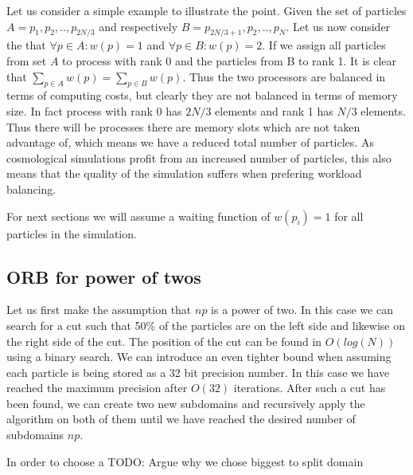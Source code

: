 \documentclass[]{article}
\begin{document}
Let us consider a simple example to illustrate the point. Given the set of particles $A = {p_1, p_2, .., p_{2N/3}}$ and respectively $B = {p_{2N/3 + 1}, p_2, .., p_{N}}$. Let us now consider the that $\forall p \in A : w(p) = 1$ and $\forall p \in B : w(p) = 2$. If we assign all particles from set $A$ to process with rank 0 and the particles from B to rank 1. It is clear that $\sum_{p\in A}^{} w(p) = \sum_{p\in B}^{} w(p)$. Thus the two processors are balanced in terms of computing costs, but clearly they are not balanced in terms of memory size. In fact process with rank 0 has $2N/3$ elements and rank 1 has $N/3$ elements. Thus there will be processes there are memory slots which are not taken advantage of, which means we have a reduced total number of particles. As cosmological simulations profit from an increased number of particles, this also means that the quality of the simulation suffers when prefering workload balancing.


\vspace{5mm}

For next sections we will assume a waiting function of $w(p_i) = 1$ for all particles in the simulation.

\subsection{ORB for power of twos}

Let us first make the assumption that $np$ is a power of two. In this case we can search for a cut such that 50\% of the particles are on the left side and likewise on the right side of the cut. The position of the cut can be found in $O(log(N))$ using a binary search. We can introduce an even tighter bound when assuming each particle is being stored as a 32 bit precision number. In this case we have reached the maximum precision after $O(32)$ iterations. After such a cut has been found, we can create two new subdomains and recursively apply the algorithm on both of them until we have reached the desired number of subdomains $np$. 

In order to choose a TODO: Argue why we chose biggest to split domain
\vspace{5mm}

\def\x{8}
\def\y{8}
\end{document}
